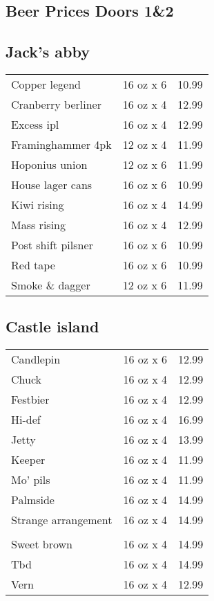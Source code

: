 \documentclass{article}%
\begin{document}
%
\pagestyle{empty}%
\normalsize%
%
\setlength{\columnseprule}{0.5pt}%
\setlength{\columnsep}{1cm}%
\renewcommand{\familydefault}{\sfdefault}%
\sffamily%
\begin{multicols}{3}%
\section*{\selectfont Beer Prices Doors 1\&2}%

%
\subsection*{Jack's abby}%
\begin{tabular}{l c r}%
Copper legend&16 oz x 6&10.99\\%
Cranberry berliner&16 oz x 4&12.99\\%
Excess ipl&16 oz x 4&12.99\\%
Framinghammer 4pk&12 oz x 4&11.99\\%
Hoponius union&12 oz x 6&11.99\\%
House lager cans&16 oz x 6&10.99\\%
Kiwi rising&16 oz x 4&14.99\\%
Mass rising&16 oz x 4&12.99\\%
Post shift pilsner&16 oz x 6&10.99\\%
Red tape&16 oz x 6&10.99\\%
Smoke \& dagger&12 oz x 6&11.99\\%
\end{tabular}

%
\subsection*{Castle island}%
\begin{tabular}{l c r}%
Candlepin&16 oz x 6&12.99\\%
Chuck&16 oz x 4&12.99\\%
Festbier&16 oz x 4&12.99\\%
Hi{-}def&16 oz x 4&16.99\\%
Jetty&16 oz x 4&13.99\\%
Keeper&16 oz x 4&11.99\\%
Mo' pils&16 oz x 4&11.99\\%
Palmside&16 oz x 4&14.99\\%
\multirow{1}{15ex}{Strange arrangement}&16 oz x 4&14.99\\%
&&\\%
Sweet brown&16 oz x 4&14.99\\%
Tbd&16 oz x 4&14.99\\%
Vern&16 oz x 4&12.99\\%
\end{tabular}


\end{multicols}
\end{document}
